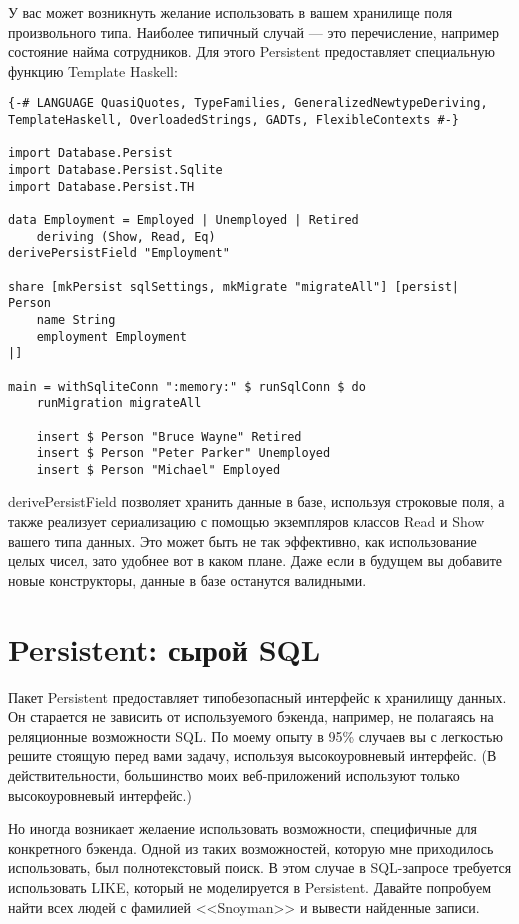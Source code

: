 У вас может возникнуть желание использовать в вашем хранилище поля произвольного типа. Наиболее типичный случай --- это перечисление, например состояние найма сотрудников. Для этого Persistent предоставляет специальную функцию Template Haskell:

\begin{lstlisting}
{-# LANGUAGE QuasiQuotes, TypeFamilies, GeneralizedNewtypeDeriving, TemplateHaskell, OverloadedStrings, GADTs, FlexibleContexts #-}

import Database.Persist
import Database.Persist.Sqlite
import Database.Persist.TH

data Employment = Employed | Unemployed | Retired
    deriving (Show, Read, Eq)
derivePersistField "Employment"

share [mkPersist sqlSettings, mkMigrate "migrateAll"] [persist|
Person
    name String
    employment Employment
|]

main = withSqliteConn ":memory:" $ runSqlConn $ do
    runMigration migrateAll

    insert $ Person "Bruce Wayne" Retired
    insert $ Person "Peter Parker" Unemployed
    insert $ Person "Michael" Employed
\end{lstlisting}%

derivePersistField позволяет хранить данные в базе, используя строковые поля, а также реализует сериализацию с помощью экземпляров классов Read и Show вашего типа данных. Это может быть не так эффективно, как использование целых чисел, зато удобнее вот в каком плане. Даже если в будущем вы добавите новые конструкторы, данные в базе останутся валидными.

\section{Persistent: сырой SQL} %

Пакет Persistent предоставляет типобезопасный интерфейс к хранилищу данных. Он старается не зависить от используемого бэкенда, например, не полагаясь на реляционные возможности SQL. По моему опыту в 95\% случаев вы с легкостью решите стоящую перед вами задачу, используя высокоуровневый интерфейс. (В действительности, большинство моих веб-приложений используют только высокоуровневый интерфейс.)

Но иногда возникает желаение использовать возможности, специфичные для конкретного бэкенда. Одной из таких возможностей, которую мне приходилось использовать, был полнотекстовый поиск. В этом случае в SQL-запросе требуется использовать LIKE, который не моделируется в Persistent. Давайте попробуем найти всех людей с фамилией <<Snoyman>> и вывести найденные записи.


